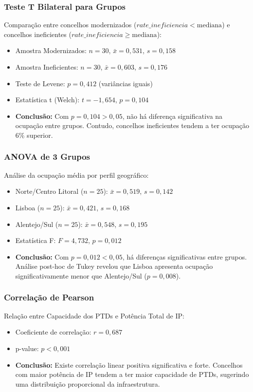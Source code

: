 \documentclass[conference]{IEEEtran}
\begin{document}
\subsubsection{Teste T Bilateral para Grupos}
Comparação entre concelhos modernizados ($rate\_ineficiencia < \text{mediana}$) e concelhos ineficientes ($rate\_ineficiencia \geq \text{mediana}$):
\begin{itemize}
\item Amostra Modernizados: $n = 30$, $\bar{x} = 0,531$, $s = 0,158$
\item Amostra Ineficientes: $n = 30$, $\bar{x} = 0,603$, $s = 0,176$
\item Teste de Levene: $p = 0,412$ (variâncias iguais)
\item Estatística t (Welch): $t = -1,654$, $p = 0,104$
\item \textbf{Conclusão:} Com $p = 0,104 > 0,05$, não há diferença significativa na ocupação entre grupos. Contudo, concelhos ineficientes tendem a ter ocupação 6\% superior.
\end{itemize}

\subsubsection{ANOVA de 3 Grupos}
Análise da ocupação média por perfil geográfico:
\begin{itemize}
\item Norte/Centro Litoral ($n = 25$): $\bar{x} = 0,519$, $s = 0,142$
\item Lisboa ($n = 25$): $\bar{x} = 0,421$, $s = 0,168$
\item Alentejo/Sul ($n = 25$): $\bar{x} = 0,548$, $s = 0,195$
\item Estatística F: $F = 4,732$, $p = 0,012$
\item \textbf{Conclusão:} Com $p = 0,012 < 0,05$, há diferenças significativas entre grupos. Análise post-hoc de Tukey revelou que Lisboa apresenta ocupação significativamente menor que Alentejo/Sul ($p = 0,008$).
\end{itemize}

\subsubsection{Correlação de Pearson}
Relação entre Capacidade dos PTDs e Potência Total de IP:
\begin{itemize}
\item Coeficiente de correlação: $r = 0,687$
\item p-value: $p < 0,001$
\item \textbf{Conclusão:} Existe correlação linear positiva significativa e forte. Concelhos com maior potência de IP tendem a ter maior capacidade de PTDs, sugerindo uma distribuição proporcional da infraestrutura.
\end{itemize}
\end{document}
